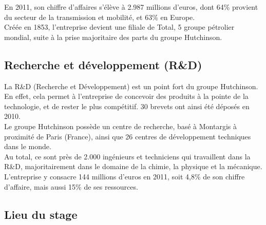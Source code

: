 En 2011, son chiffre d'affaires s'élève à 2.987 millions d'euros, dont 64\% provient du secteur de la transmission et mobilité, et 63\% en Europe.
\\


Créée en 1853, l'entreprise devient une filiale de Total, 5 groupe pétrolier mondial, suite à la prise majoritaire des parts du groupe Hutchinson.
\\





\subsection{Recherche et développement (R\&D)}

La R\&D (Recherche et Développement) est un point fort du groupe Hutchinson.
En effet, cela permet à l'entreprise de concevoir des produits à la pointe de la technologie, et de rester le plus compétitif.
30 brevets ont ainsi été déposés en 2010.
\\


Le groupe Hutchinson possède un centre de recherche, basé à Montargis à proximité de Paris (France), ainsi que 26 centres de développement techniques dans le monde.
\\


Au total, ce sont près de 2.000 ingénieurs et techniciens qui travaillent dans la R\&D, majoritairement dans le domaine de la chimie, la physique et la mécanique.
L'entreprise y consacre 144 millions d'euros en 2011, soit 4,8\% de son chiffre d'affaire, mais aussi 15\% de ses ressources.
\\





\subsection{Lieu du stage}

